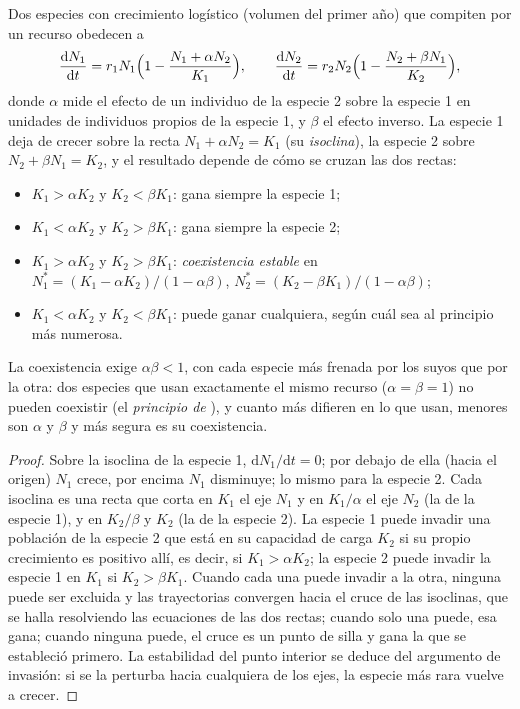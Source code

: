 \begin{theorem}\label{thm:b2:speciation:lv}
Dos especies con crecimiento logístico (volumen del primer año) que
compiten por un recurso obedecen a
\[
\frac{\mathrm{d}N_1}{\mathrm{d}t} = r_1 N_1\Bigl(1 - \frac{N_1 + \alpha N_2}{K_1}\Bigr), \qquad
\frac{\mathrm{d}N_2}{\mathrm{d}t} = r_2 N_2\Bigl(1 - \frac{N_2 + \beta N_1}{K_2}\Bigr),
\]
donde $\alpha$ mide el efecto de un individuo de la especie 2 sobre la
especie 1 en unidades de individuos propios de la especie 1, y $\beta$ el
efecto inverso. La especie 1 deja de crecer sobre la recta $N_1 + \alpha N_2 =
K_1$ (su \emph{isoclina}), la especie 2 sobre $N_2 + \beta N_1 = K_2$, y
el resultado depende de cómo se cruzan las dos rectas:
\begin{itemize}
  \item $K_1 > \alpha K_2$ y $K_2 < \beta K_1$: gana siempre la
        especie 1;
  \item $K_1 < \alpha K_2$ y $K_2 > \beta K_1$: gana siempre la
        especie 2;
  \item $K_1 > \alpha K_2$ y $K_2 > \beta K_1$: \emph{coexistencia
        estable} en $N_1^{*} = (K_1 - \alpha K_2)/(1 - \alpha\beta)$,
        $N_2^{*} = (K_2 - \beta K_1)/(1 - \alpha\beta)$;
  \item $K_1 < \alpha K_2$ y $K_2 < \beta K_1$: puede ganar cualquiera,
        según cuál sea al principio más numerosa.
\end{itemize}
La coexistencia exige $\alpha\beta < 1$, con cada especie más frenada por
los suyos que por la otra: dos especies que usan exactamente el mismo
recurso ($\alpha = \beta = 1$) no pueden coexistir
(el \emph{principio de }), y cuanto más difieren en
lo que usan, menores son $\alpha$ y $\beta$ y más segura es su
coexistencia.
\end{theorem}
\begin{proof}
Sobre la isoclina de la especie 1, $\mathrm{d}N_1/\mathrm{d}t = 0$; por
debajo de ella (hacia el origen) $N_1$ crece, por encima $N_1$ disminuye;
lo mismo para la especie 2. Cada isoclina es una recta que corta en $K_1$
el eje $N_1$ y en $K_1/\alpha$ el eje $N_2$ (la de la especie 1), y en
$K_2/\beta$ y $K_2$ (la de la especie 2). La especie 1 puede invadir una
población de la especie 2 que está en su capacidad de carga $K_2$ si su
propio crecimiento es positivo allí, es decir, si $K_1 > \alpha K_2$; la
especie 2 puede invadir la especie 1 en $K_1$ si $K_2 > \beta K_1$. Cuando
cada una puede invadir a la otra, ninguna puede ser excluida y las
trayectorias convergen hacia el cruce de las isoclinas, que se halla
resolviendo las ecuaciones de las dos rectas; cuando solo una puede, esa
gana; cuando ninguna puede, el cruce es un punto de silla y gana la que se
estableció primero. La estabilidad del punto interior se deduce del
argumento de invasión: si se la perturba hacia cualquiera de los ejes, la
especie más rara vuelve a crecer.
\end{proof}

